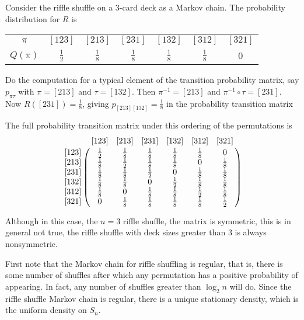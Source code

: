 \documentclass[12pt]{article}
\begin{document}
\begin{example}
    Consider the riffle shuffle on a \( 3 \)-card deck as a Markov
    chain. The probability distribution for \( R \) is \begin{tabular}{ccccccc}
        $\pi$    & $[123]$       & $[213]$       & $[231]$       & $[132]$       & $[312]$       & $[321]$ \\ 
        $Q(\pi)$ & $\frac{1}{2}$ & $\frac{1}{8}$ & $\frac{1}{8}$ & $\frac{1}{8}$ & $\frac{1}{8}$ & 0       \\ 
    \end{tabular}

    Do the computation for a typical element of the transition
    probability matrix, say \( p_{\pi \tau} \) with \( \pi = [213] \)
    and \( \tau = [132] \). Then \( \pi^{-1} = [213] \) and \( \pi^{-1}
    \circ \tau = [231] \).  Now \( R([231]) = \frac{1}{8} \), giving \(
    p_{[213] [132]} = \frac{1}{8} \) in the probability transition
    matrix

    The full probability transition matrix under this ordering of the
    permutations is
    \[
        \bordermatrix{
            & [123]      & [213]      & [231]       & [132]       & [312]       & [321] \cr
       [123]& \frac{1}{2}& \frac{1}{8}& \frac{1}{8} & \frac{1}{8} & \frac{1}{8} & 0 \cr
       [213]& \frac{1}{8}& \frac{1}{2}& \frac{1}{8} & \frac{1}{8} & 0           & \frac{1}{8} \cr
       [231]& \frac{1}{8}& \frac{1}{8}& \frac{1}{2} & 0           & \frac{1}{8} & \frac{1}{8} \cr
       [132]& \frac{1}{8}& \frac{1}{8}& 0           & \frac{1}{2} & \frac{1}{8} & \frac{1}{8} \cr
       [312]& \frac{1}{8}& 0          & \frac{1}{8} & \frac{1}{8} & \frac{1}{2} & \frac{1}{8} \cr
       [321]& 0          & \frac{1}{8}& \frac{1}{8} & \frac{1}{8} & \frac{1}{8} & \frac{1}{2} \cr
        }
    \]

    Although in this case, the \( n=3 \) riffle shuffle, the matrix is
    symmetric, this is in general not true, the riffle shuffle with deck
    sizes greater than \( 3 \) is always nonsymmetric.
\end{example}

First note that the Markov chain for riffle shuffling is regular, that
is, there is some number of shuffles after which any permutation has a
positive probability of appearing.  In fact, any number of shuffles
greater than \( \log_2 n \) will do.  Since the riffle shuffle Markov
chain is regular, there is a unique stationary density, which is the
uniform density on \( S_n \).
\end{document}
